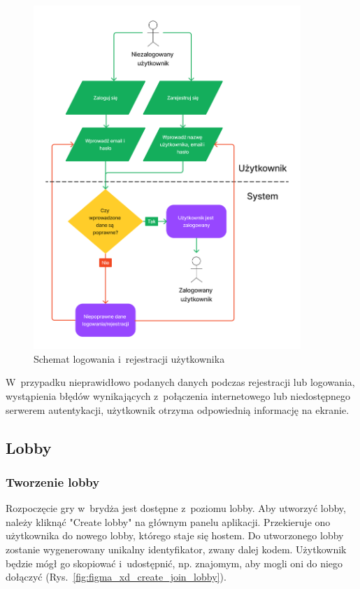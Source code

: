 \begin{figure}[hbt!]
  \centering
  \includegraphics[width=0.9\textwidth]{img/schematy/login.png}
  \caption{Schemat logowania i~rejestracji użytkownika}
  \label{fig:figma_xd_login}
\end{figure}

W~przypadku nieprawidłowo podanych danych podczas rejestracji
lub logowania, wystąpienia błędów wynikających z~połączenia internetowego lub
niedostępnego serwerem autentykacji, użytkownik otrzyma odpowiednią
informację na ekranie.

\FloatBarrier


\subsection{Lobby}

\subsubsection{Tworzenie lobby}

Rozpoczęcie gry w~brydża jest dostępne z~poziomu lobby. Aby utworzyć
lobby, należy kliknąć "Create lobby"\xspace na głównym panelu
aplikacji. Przekieruje ono użytkownika do nowego lobby, którego staje
się hostem. Do utworzonego lobby zostanie wygenerowany
unikalny identyfikator, zwany dalej kodem. Użytkownik będzie mógł go skopiować
i~udostępnić, np. znajomym, aby mogli oni do niego dołączyć (Rys.~\ref{fig:figma_xd_create_join_lobby}).


